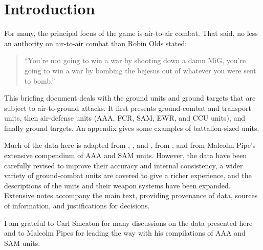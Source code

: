 


\chapter*{Introduction}

For many, the principal focus of the {\AirPow} game is air-to-air combat.
That said, no less an authority on air-to-air combat than Robin Olds stated:%
\begin{quote}
    “You’re not going to win a war by shooting down a damn MiG, you’re going to win a war by bombing the bejesus out of whatever you were sent to bomb.”
\end{quote}
This briefing document deals with the ground units and ground targets that are subject to air-to-ground attacks.
It first presents ground-combat and transport units, then air-defense units (AAA, FCR, SAM, EWR, and CCU units), and finally ground targets. An appendix gives some examples of battalion-sized units.

Much of the data here is adapted from {\AirStr}, {\EOTG}, and {\TSOH}, from {\APJ}, and from Malcolm Pipe's extensive compendium of AAA and SAM units. However, the data have been carefully revised to improve their accuracy and internal consistency, a wider variety of ground-combat units are covered to give a richer experience, and the descriptions of the units and their weapon systems have been expanded.
Extensive notes accompany the main text, providing provenance of data, sources of information, and justifications for decisions.

I am grateful to Carl Smeaton for many discussions on the data presented here and to Malcolm Pipes for leading the way with his compilations of AAA and SAM units.

\setcounter{tocdepth}{1}
\tableofcontents
\listoftables
